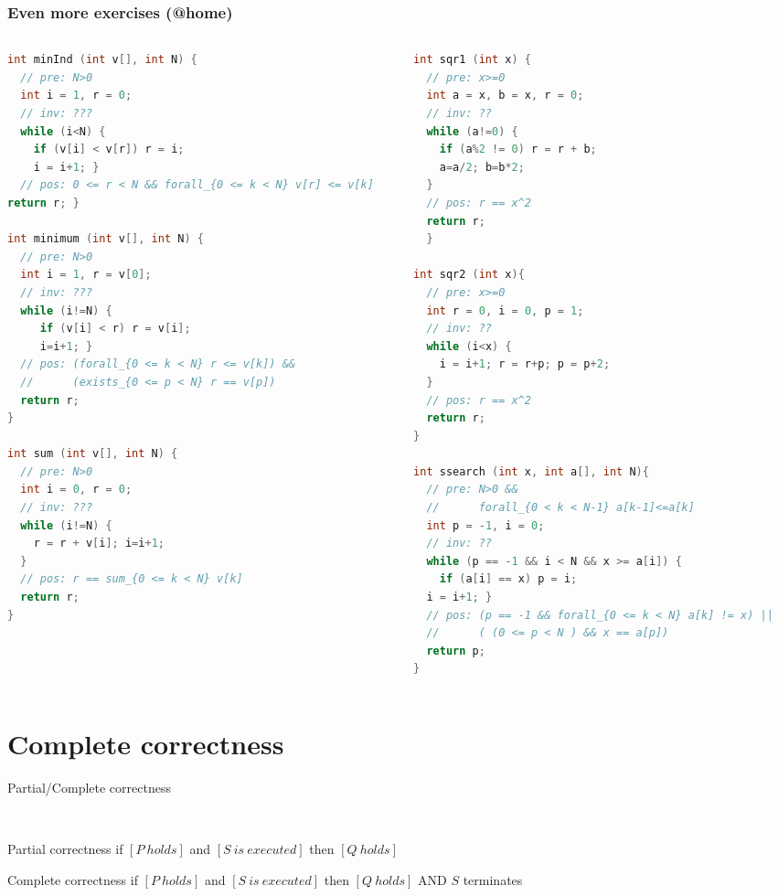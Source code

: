 \documentclass[aspectratio=169]{beamer}
\begin{document}
\begin{frame}[fragile]\frametitle{Even more exercises (@home)}
\begin{columns}
\begin{column}{0.48\textwidth}
\begin{lstlisting}[language=C++,style=tiny]
int minInd (int v[], int N) {
  // pre: N>0
  int i = 1, r = 0;
  // inv: ???
  while (i<N) {
    if (v[i] < v[r]) r = i;
    i = i+1; }
  // pos: 0 <= r < N && forall_{0 <= k < N} v[r] <= v[k]
return r; }

int minimum (int v[], int N) {
  // pre: N>0
  int i = 1, r = v[0];
  // inv: ???
  while (i!=N) {
     if (v[i] < r) r = v[i];
     i=i+1; }
  // pos: (forall_{0 <= k < N} r <= v[k]) &&
  //      (exists_{0 <= p < N} r == v[p])
  return r;
}

int sum (int v[], int N) {
  // pre: N>0
  int i = 0, r = 0;
  // inv: ???
  while (i!=N) {
    r = r + v[i]; i=i+1;
  }
  // pos: r == sum_{0 <= k < N} v[k]
  return r;
}
\end{lstlisting}
\end{column}
\begin{column}{0.48\textwidth}
\begin{lstlisting}[language=C++,style=tiny]
int sqr1 (int x) {
  // pre: x>=0
  int a = x, b = x, r = 0;
  // inv: ??
  while (a!=0) {
    if (a%2 != 0) r = r + b;
    a=a/2; b=b*2;
  }
  // pos: r == x^2
  return r;
  }

int sqr2 (int x){
  // pre: x>=0
  int r = 0, i = 0, p = 1;
  // inv: ??
  while (i<x) {
    i = i+1; r = r+p; p = p+2;
  }
  // pos: r == x^2
  return r;
}

int ssearch (int x, int a[], int N){
  // pre: N>0 &&
  //      forall_{0 < k < N-1} a[k-1]<=a[k]
  int p = -1, i = 0;
  // inv: ??
  while (p == -1 && i < N && x >= a[i]) {
    if (a[i] == x) p = i;
  i = i+1; }
  // pos: (p == -1 && forall_{0 <= k < N} a[k] != x) ||
  //      ( (0 <= p < N ) && x == a[p])
  return p;
}
\end{lstlisting}
\end{column}
\end{columns}
\end{frame}


\section{Complete correctness}

\begin{frame}{Partial/Complete correctness}

~~\\[10mm]

\begin{alertblock}{Partial correctness}
  if $[P~holds]$ and $[S~is~executed]$ then $[Q~holds]$
\end{alertblock}

\begin{alertblock}{Complete correctness}
  if $[P~holds]$ and $[S~is~executed]$ then $[Q~holds]$ \alert{AND $S$ terminates}
\end{alertblock}
\end{frame}
\end{document}
